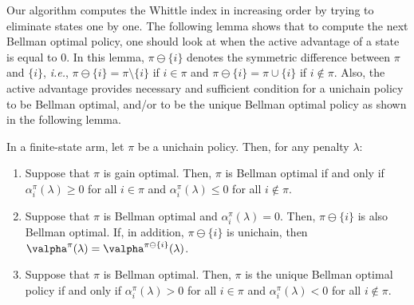 Our algorithm computes the Whittle index in increasing order by trying to eliminate states one by one.
The following lemma shows that to compute the next Bellman optimal policy, one should look at when the active advantage of a state is equal to $0$.
In this lemma, $\pi\ominus\{i\}$ denotes the symmetric difference between $\pi$ and $\{i\}$, \emph{i.e.}, $\pi\ominus\{i\}=\pi\setminus\{i\}$ if $i\in\pi$ and $\pi\ominus\{i\}=\pi\cup\{i\}$ if $i\not\in\pi$.
Also, the active advantage provides necessary and sufficient condition for a unichain policy to be Bellman optimal, and/or to be the unique Bellman optimal policy as shown in the following lemma.
\begin{lem}
    \label{ch:cpt:lem:unicity_binary}
    In a finite-state arm, let $\pi$ be a unichain policy. Then, for any penalty $\lambda$:
    \begin{enumerate}[label=(\roman*)]
        \item \label{it:binary_opt1} Suppose that $\pi$ is gain optimal. Then, $\pi$ is Bellman optimal if and only if $\alpha^\pi_i(\lambda)\ge0$ for all $i\in\pi$ and $\alpha^\pi_i(\lambda)\le0$ for all $i\notin\pi$.
        \item \label{it:binary_optX} Suppose that $\pi$ is Bellman optimal and $\alpha^\pi_i(\lambda)=0$. Then, $\pi\ominus\{i\}$ is also Bellman optimal. If, in addition, $\pi\ominus\{i\}$ is unichain, then $\valpha^\pi(\lambda)=\valpha^{\pi\ominus\{i\}}(\lambda)$.
        \item \label{it:binary_opt2} Suppose that $\pi$ is Bellman optimal. Then, $\pi$ is the unique Bellman optimal policy if and only if $\alpha^\pi_i(\lambda)>0$ for all $i\in\pi$ and $\alpha^\pi_i(\lambda)<0$ for all $i\notin\pi$.
    \end{enumerate}
\end{lem}
